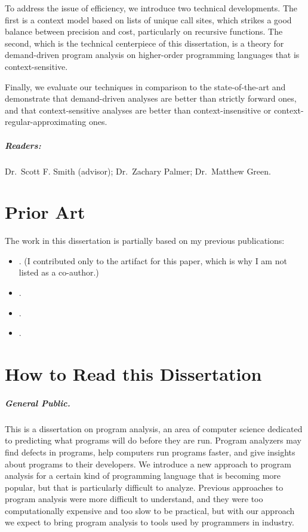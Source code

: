 \documentclass[12pt, oneside]{book}
\begin{document}
To address the issue of efficiency, we introduce two technical developments. The first is a context model based on lists of unique call sites, which strikes a good balance between precision and cost, particularly on recursive functions. The second, which is the technical centerpiece of this dissertation, is a theory for demand-driven program analysis on higher-order programming languages that is context-sensitive.

Finally, we evaluate our techniques in comparison to the state-of-the-art and demonstrate that demand-driven analyses are better than strictly forward ones, and that context-sensitive analyses are better than context-insensitive or context-regular-approximating ones.

\paragraph{Readers:}

Dr.~Scott F. Smith (advisor); Dr.~Zachary Palmer; Dr.~Matthew Green.

\chapter{Prior Art}

The work in this dissertation is partially based on my previous publications:

\begin{itemize}
  \item {}. (I contributed only to the artifact for this paper, which is why I am not listed as a co-author.)
  \item {}.
  \item {}.
  \item {}.
\end{itemize}

\chapter{How to Read this Dissertation}

\paragraph{General Public.}

This is a dissertation on program analysis, an area of computer science dedicated to predicting what programs will do before they are run. Program analyzers may find defects in programs, help computers run programs faster, and give insights about programs to their developers. We introduce a new approach to program analysis for a certain kind of programming language that is becoming more popular, but that is particularly difficult to analyze. Previous approaches to program analysis were more difficult to understand, and they were too computationally expensive and too slow to be practical, but with our approach we expect to bring program analysis to tools used by programmers in industry.
\end{document}
